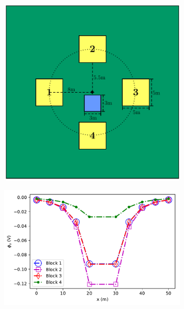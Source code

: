 \documentclass[preprint,authoryear,12pt]{elsarticle}
\begin{document}
\begin{figure}[htp]
   \begin{center}
      \begin{subfigure}{0.4\linewidth}
         \includegraphics[trim=0cm 0cm 0cm 0cm, clip=true,width=\linewidth]{./figures/Fig5a.pdf}
         \caption{}
         \label{fig:4Blocks_Tunnel_Model}
      \end{subfigure}
      \hfill
      \begin{subfigure}{0.59\linewidth}
         \includegraphics[trim=0cm 0cm 0cm 0cm, clip=true,width=\linewidth]{./figures/Fig5b.pdf}

\end{subfigure}
\end{center}
\end{figure}
\end{document}
